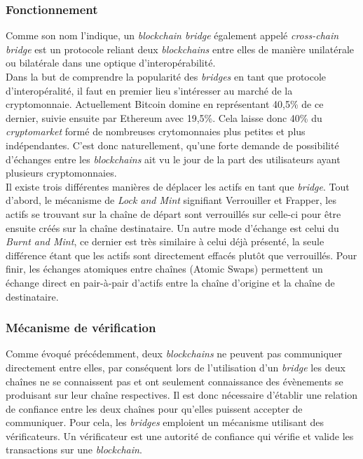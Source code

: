
\subsubsection{Fonctionnement}

Comme son nom l’indique, un \textit{\gls{blockchain} bridge} également appelé \textit{\gls{cross-chain} bridge} est un protocole reliant deux \textit{\gls{blockchain}s} entre elles de manière unilatérale ou bilatérale dans une optique d’interopérabilité.\\

Dans la but de comprendre la popularité des \textit{bridges} en tant que protocole d’interopéralité, il faut en premier lieu s’intéresser au marché de la cryptomonnaie. Actuellement Bitcoin domine en représentant 40,5\% de ce dernier, suivie ensuite par Ethereum avec 19,5\%. Cela laisse donc 40\% du \textit{cryptomarket} formé de nombreuses crytomonnaies plus petites et plus indépendantes. C’est donc naturellement, qu’une forte demande de possibilité d’échanges entre les \textit{\gls{blockchain}s} ait vu le jour de la part des utilisateurs ayant plusieurs cryptomonnaies\cite{NgraveNumbers}.\\

Il existe trois différentes manières de déplacer les \gls{actif}s en tant que \textit{bridge}. Tout d’abord, le mécanisme de \textit{Lock and Mint} signifiant Verrouiller et Frapper, les \gls{actif}s se trouvant sur la chaîne de départ sont verrouillés sur celle-ci pour être ensuite créés sur la chaîne destinataire. Un autre mode d'échange est celui du \textit{Burnt and Mint}, ce dernier est très similaire à celui déjà présenté, la seule différence étant que les \gls{actif}s sont directement effacés plutôt que verrouillés. Pour finir, les échanges atomiques entre chaînes (Atomic Swaps) permettent un échange direct en pair-à-pair d'\gls{actif}s entre la chaîne d’origine et la chaîne de destinataire.\cite{EthereumMechanism}

\subsubsection{Mécanisme de vérification}

Comme évoqué précédemment, deux \textit{\gls{blockchain}s} ne peuvent pas communiquer directement entre elles, par conséquent lors de l’utilisation d’un \textit{bridge} les deux chaînes ne se connaissent pas et ont seulement connaissance des évènements se produisant sur leur chaîne respectives. Il est donc nécessaire d’établir une relation de confiance entre les deux chaînes pour qu’elles puissent accepter de communiquer. Pour cela, les \textit{bridges} emploient un mécanisme utilisant des vérificateurs. Un vérificateur est une autorité de confiance qui vérifie et valide les transactions sur une \textit{\gls{blockchain}}. \\


